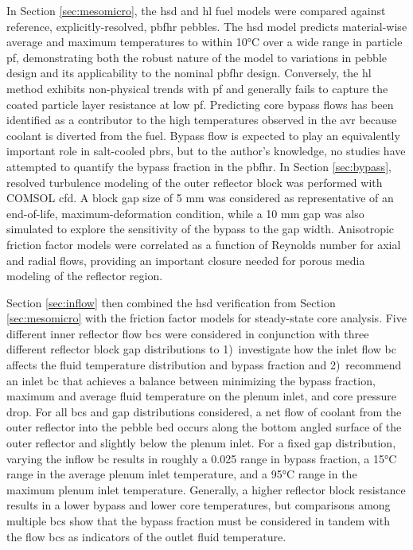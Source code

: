 In Section \ref{sec:mesomicro}, the \gls{hsd} and \gls{hl} fuel models were compared against reference, explicitly-resolved, \gls{pbfhr} pebbles. The \gls{hsd} model predicts material-wise average and maximum temperatures to within 10\si{\celsius} over a wide range in particle \gls{pf}, demonstrating both the robust nature of the model to variations in pebble design and its applicability to the nominal \gls{pbfhr} design. Conversely, the \gls{hl} method exhibits non-physical trends with \gls{pf} and generally fails to capture the coated particle layer resistance at low \gls{pf}. Predicting core bypass flows has been identified as a contributor to the high temperatures observed in the \gls{avr} because coolant is diverted from the fuel. Bypass flow is expected to play an equivalently important role in salt-cooled \glspl{pbr}, but to the author's knowledge, no studies have attempted to quantify the bypass fraction in the \gls{pbfhr}. In Section \ref{sec:bypass}, resolved turbulence modeling of the outer reflector block was performed with COMSOL \gls{cfd}. A block gap size of 5 \si{\milli\meter} was considered as representative of an end-of-life, maximum-deformation condition, while a 10 \si{\milli\meter} gap was also simulated to explore the sensitivity of the bypass to the gap width. Anisotropic friction factor models were correlated as a function of Reynolds number for axial and radial flows, providing an important closure needed for porous media modeling of the reflector region.

Section \ref{sec:inflow} then combined the \gls{hsd} verification from Section \ref{sec:mesomicro} with the friction factor models for steady-state core analysis. Five different inner reflector flow \glspl{bc} were considered in conjunction with three different reflector block gap distributions to 1)~investigate how the inlet flow \gls{bc} affects the fluid temperature distribution and bypass fraction and 2)~recommend an inlet \gls{bc} that achieves a balance between minimizing the bypass fraction, maximum and average fluid temperature on the plenum inlet, and core pressure drop. For all \glspl{bc} and gap distributions considered, a net flow of coolant from the outer reflector into the pebble bed occurs along the bottom angled surface of the outer reflector and slightly below the plenum inlet. For a fixed gap distribution, varying the inflow \gls{bc} results in roughly a 0.025 range in bypass fraction, a 15\si{\celsius} range in the average plenum inlet temperature, and a 95\si{\celsius} range in the maximum plenum inlet temperature. Generally, a higher reflector block resistance results in a lower bypass and lower core temperatures, but comparisons among multiple \glspl{bc} show that the bypass fraction must be considered in tandem with the flow \glspl{bc} as indicators of the outlet fluid temperature.


